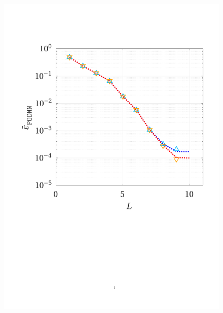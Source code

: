 \documentclass[12pt, a4paper, twoside, openright]{report}
\numberwithin{equation}{chapter}
\theoremstyle{theorem}
\theoremstyle{definition}
\theoremstyle{remark}
\theoremstyle{proposition}
\numberwithin{figure}{chapter}
\begin{document}
		\begin{figure}[H]
			\center
			\includegraphics[scale = 0.40, trim = {1cm 9cm 1cm 3cm}, clip]{poisson1d_3_nn_test}

\end{figure}
\end{document}
